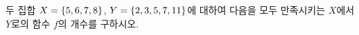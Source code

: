 두 집합 $X=\{5{,}\mkern3mu\mathopen{}6{,}\mkern3mu\mathopen{}7{,}\mkern3mu\mathopen{}8\}$, $Y=\{2{,}\mkern3mu\mathopen{}3{,}\mkern3mu\mathopen{}5{,}\mkern3mu\mathopen{}7{,}\mkern3mu\mathopen{}11\}$에 대하여 다음을 모두 만족시키는 $X$에서 $Y$로의 함수 $f$의 개수를 구하시오. 
